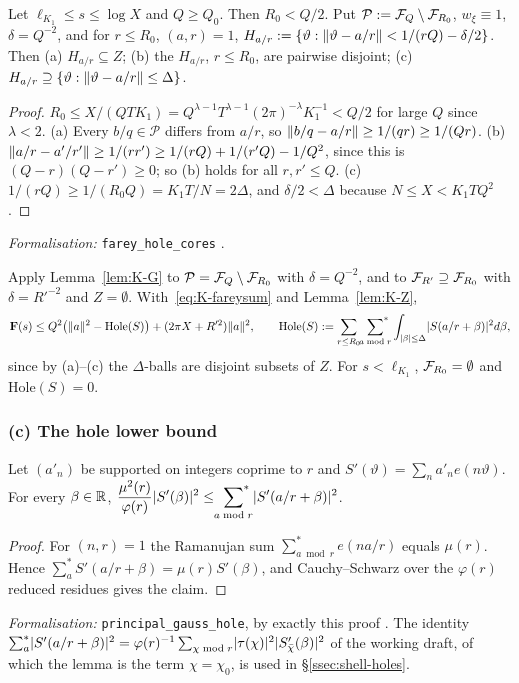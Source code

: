 \begin{lemma}\label{lem:K-Z}
Let $\ell_{K_1}\le s\le\log X$ and $Q\ge Q_0$. Then $R_0<Q/2$. Put $\mathcal P:=\mathcal F_Q\setminus\mathcal F_{R_0}$, $w_\xi\equiv1$, $\delta=Q^{-2}$, and for
$r\le R_0$, $(a,r)=1$, $H_{a/r}:=\{\vartheta:\lVert \vartheta-a/r\rVert<1/(rQ)-\delta/2\}$. Then \textup{(a)} $H_{a/r}\subseteq Z$; \textup{(b)} the
$H_{a/r}$, $r\le R_0$, are pairwise disjoint; \textup{(c)} $H_{a/r}\supseteq\{\vartheta:\lVert \vartheta-a/r\rVert\le\Delta\}$.
\end{lemma}
\begin{proof}
$R_0\le X/(QTK_1)=Q^{\lambda-1}T^{\lambda-1}(2\pi)^{-\lambda}K_1^{-1}<Q/2$ for large $Q$ since $\lambda<2$. (a) Every $b/q\in\mathcal P$ differs from
$a/r$, so $\lVert b/q-a/r\rVert\ge1/(qr)\ge1/(Qr)$. (b) $\lVert a/r-a'/r'\rVert\ge1/(rr')\ge1/(rQ)+1/(r'Q)-1/Q^2$, since this is
$(Q-r)(Q-r')\ge0$; so (b) holds for all $r,r'\le Q$. (c) $1/(rQ)\ge1/(R_0Q)=K_1T/N=2\Delta$, and $\delta/2<\Delta$ because $N\le X<K_1TQ^2$.
\end{proof}
\emph{Formalisation:} \texttt{farey\_hole\_cores} \tagL.

Apply Lemma~\ref{lem:K-G} to $\mathcal P=\mathcal F_Q\setminus\mathcal F_{R_0}$ with $\delta=Q^{-2}$, and to $\mathcal F_{R'}\supseteq\mathcal F_{R_0}$ with
$\delta=R'^{-2}$ and $Z=\emptyset$. With~\eqref{eq:K-fareysum} and Lemma~\ref{lem:K-Z},
\begin{equation}\label{eq:K-G-applied}
\mathbf F(s)\le Q^2\bigl(\lVert a\rVert^2-\mathrm{Hole}(S)\bigr)+(2\pi X+R'^2)\lVert a\rVert^2,\qquad
\mathrm{Hole}(S):=\sum_{r\le R_0}\sideset{}{^*}\sum_{a\bmod r}\int_{\lvert \beta\rvert\le\Delta}\lvert S(a/r+\beta)\rvert^2d\beta,
\end{equation}
since by (a)--(c) the $\Delta$-balls are disjoint subsets of $Z$. For $s<\ell_{K_1}$, $\mathcal F_{R_0}=\emptyset$ and $\mathrm{Hole}(S)=0$.

\subsubsection*{(c) The hole lower bound}
\begin{lemma}\label{lem:K-R}
Let $(a'_n)$ be supported on integers coprime to $r$ and $S'(\vartheta)=\sum_na'_ne(n\vartheta)$. For every $\beta\in\mathbb R$,
$\displaystyle\frac{\mu^2(r)}{\varphi(r)}\lvert S'(\beta)\rvert^2\le\sideset{}{^*}\sum_{a\bmod r}\lvert S'(a/r+\beta)\rvert^2$.
\end{lemma}
\begin{proof}
For $(n,r)=1$ the Ramanujan sum $\sum^*_{a\bmod r}e(na/r)$ equals $\mu(r)$. Hence $\sum^*_aS'(a/r+\beta)=\mu(r)S'(\beta)$, and
Cauchy--Schwarz over the $\varphi(r)$ reduced residues gives the claim.
\end{proof}
\emph{Formalisation:} \texttt{principal\_gauss\_hole}, by exactly this proof \tagL. The identity
$\sum^*_a\lvert S'(a/r+\beta)\rvert^2=\varphi(r)^{-1}\sum_{\chi\bmod r}\lvert \tau(\chi)\rvert^2\lvert S'_{\bar\chi}(\beta)\rvert^2$ of the working draft, of which
the lemma is the term $\chi=\chi_0$, is used in \S\ref{ssec:shell-holes}.

